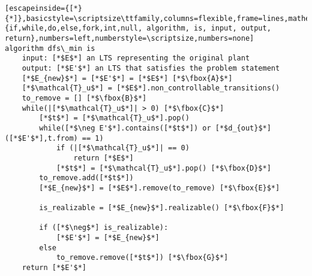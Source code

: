\renewcommand{\ttdefault}{pcr}
\begin{lstlisting}[escapeinside={[*}{*]},basicstyle=\scriptsize\ttfamily,columns=flexible,frame=lines,mathescape=true,keywordstyle=\textbf,morekeywords={if,while,do,else,fork,int,null, algorithm, is, input, output, return},numbers=left,numberstyle=\scriptsize,numbers=none]
algorithm dfs\_min is
	input: [*$E$*] an LTS representing the original plant
	output: [*$E'$*] an LTS that satisfies the problem statement
	[*$E_{new}$*] = [*$E'$*] = [*$E$*] [*$\fbox{A}$*]
	[*$\mathcal{T}_u$*] = [*$E$*].non_controllable_transitions()
	to_remove = [] [*$\fbox{B}$*]
	while(|[*$\mathcal{T}_u$*]| > 0) [*$\fbox{C}$*]
		[*$t$*] = [*$\mathcal{T}_u$*].pop()
		while([*$\neg E'$*].contains([*$t$*]) or [*$d_{out}$*]([*$E'$*],t.from) == 1)
			if (|[*$\mathcal{T}_u$*]| == 0)
				return [*$E$*]
			[*$t$*] = [*$\mathcal{T}_u$*].pop() [*$\fbox{D}$*]
		to_remove.add([*$t$*])
		[*$E_{new}$*] = [*$E$*].remove(to_remove) [*$\fbox{E}$*]
		
		is_realizable = [*$E_{new}$*].realizable() [*$\fbox{F}$*]
		
		if ([*$\neg$*] is_realizable):
			[*$E'$*] = [*$E_{new}$*]
		else
			to_remove.remove([*$t$*]) [*$\fbox{G}$*]
	return [*$E'$*]  
\end{lstlisting}